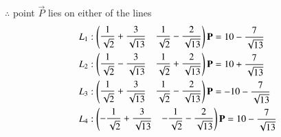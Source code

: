 \documentclass[journal,12pt,twocolumn]{IEEEtran}
\begin{document}
$\therefore$ point $\vec{P}$ lies on either of the lines
\begin{align}
L_1&:\begin{pmatrix}\dfrac{1}{\sqrt{2}}+\dfrac{3}{\sqrt{13}}& \dfrac{1}{\sqrt{2}}-\dfrac{2}{\sqrt{13}}\end{pmatrix}\mathbf{P} = 10 - \dfrac{7}{\sqrt{13}}\\
L_2&:\begin{pmatrix}\dfrac{1}{\sqrt{2}}-\dfrac{3}{\sqrt{13}}& \dfrac{1}{\sqrt{2}}+\dfrac{2}{\sqrt{13}}\end{pmatrix}\mathbf{P} = 10 + \dfrac{7}{\sqrt{13}}\\
L_3&:\begin{pmatrix}\dfrac{1}{\sqrt{2}}+\dfrac{3}{\sqrt{13}}& \dfrac{1}{\sqrt{2}}-\dfrac{2}{\sqrt{13}}\end{pmatrix}\mathbf{P} = -10 - \dfrac{7}{\sqrt{13}}\\
L_4&:\begin{pmatrix}-\dfrac{1}{\sqrt{2}}+\dfrac{3}{\sqrt{13}}& -\dfrac{1}{\sqrt{2}}-\dfrac{2}{\sqrt{13}}\end{pmatrix}\mathbf{P} = 10 - \dfrac{7}{\sqrt{13}}
\end{align}
\end{document}
